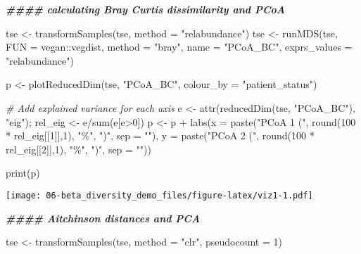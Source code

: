 \documentclass[
  oneside]{book}
\newenvironment{Shaded}{\begin{snugshade}}{\end{snugshade}}
\newcommand{\AttributeTok}[1]{\textcolor[rgb]{0.77,0.63,0.00}{#1}}
\newcommand{\CommentTok}[1]{\textcolor[rgb]{0.56,0.35,0.01}{\textit{#1}}}
\newcommand{\DecValTok}[1]{\textcolor[rgb]{0.00,0.00,0.81}{#1}}
\newcommand{\DocumentationTok}[1]{\textcolor[rgb]{0.56,0.35,0.01}{\textbf{\textit{#1}}}}
\newcommand{\FunctionTok}[1]{\textcolor[rgb]{0.00,0.00,0.00}{#1}}
\newcommand{\NormalTok}[1]{#1}
\newcommand{\OtherTok}[1]{\textcolor[rgb]{0.56,0.35,0.01}{#1}}
\newcommand{\SpecialCharTok}[1]{\textcolor[rgb]{0.00,0.00,0.00}{#1}}
\newcommand{\StringTok}[1]{\textcolor[rgb]{0.31,0.60,0.02}{#1}}
\begin{document}
\begin{Shaded}
\begin{Highlighting}[]
\DocumentationTok{\#\#\#\# calculating Bray Curtis dissimilarity and PCoA}

\NormalTok{tse }\OtherTok{\textless{}{-}} \FunctionTok{transformSamples}\NormalTok{(tse, }\AttributeTok{method =} \StringTok{"relabundance"}\NormalTok{)}
\NormalTok{tse }\OtherTok{\textless{}{-}} \FunctionTok{runMDS}\NormalTok{(tse, }\AttributeTok{FUN =}\NormalTok{ vegan}\SpecialCharTok{::}\NormalTok{vegdist, }\AttributeTok{method =} \StringTok{"bray"}\NormalTok{, }\AttributeTok{name =} \StringTok{"PCoA\_BC"}\NormalTok{, }\AttributeTok{exprs\_values =} \StringTok{"relabundance"}\NormalTok{)}


\NormalTok{p }\OtherTok{\textless{}{-}} \FunctionTok{plotReducedDim}\NormalTok{(tse, }\StringTok{"PCoA\_BC"}\NormalTok{, }\AttributeTok{colour\_by =} \StringTok{"patient\_status"}\NormalTok{)}

\CommentTok{\# Add explained variance for each axis}
\NormalTok{e }\OtherTok{\textless{}{-}} \FunctionTok{attr}\NormalTok{(}\FunctionTok{reducedDim}\NormalTok{(tse, }\StringTok{"PCoA\_BC"}\NormalTok{), }\StringTok{"eig"}\NormalTok{);}
\NormalTok{rel\_eig }\OtherTok{\textless{}{-}}\NormalTok{ e}\SpecialCharTok{/}\FunctionTok{sum}\NormalTok{(e[e}\SpecialCharTok{\textgreater{}}\DecValTok{0}\NormalTok{])          }
\NormalTok{p }\OtherTok{\textless{}{-}}\NormalTok{ p }\SpecialCharTok{+} \FunctionTok{labs}\NormalTok{(}\AttributeTok{x =} \FunctionTok{paste}\NormalTok{(}\StringTok{"PCoA 1 ("}\NormalTok{, }\FunctionTok{round}\NormalTok{(}\DecValTok{100} \SpecialCharTok{*}\NormalTok{ rel\_eig[[}\DecValTok{1}\NormalTok{]],}\DecValTok{1}\NormalTok{), }\StringTok{"\%"}\NormalTok{, }\StringTok{")"}\NormalTok{, }\AttributeTok{sep =} \StringTok{""}\NormalTok{),}
              \AttributeTok{y =} \FunctionTok{paste}\NormalTok{(}\StringTok{"PCoA 2 ("}\NormalTok{, }\FunctionTok{round}\NormalTok{(}\DecValTok{100} \SpecialCharTok{*}\NormalTok{ rel\_eig[[}\DecValTok{2}\NormalTok{]],}\DecValTok{1}\NormalTok{), }\StringTok{"\%"}\NormalTok{, }\StringTok{")"}\NormalTok{, }\AttributeTok{sep =} \StringTok{""}\NormalTok{))}

\FunctionTok{print}\NormalTok{(p)}
\end{Highlighting}
\end{Shaded}

\texttt{[image: 06-beta\_diversity\_demo\_files/figure-latex/viz1-1.pdf]}

\begin{Shaded}
\begin{Highlighting}[]
\DocumentationTok{\#\#\#\# Aitchinson distances and PCA}

\NormalTok{tse }\OtherTok{\textless{}{-}} \FunctionTok{transformSamples}\NormalTok{(tse, }\AttributeTok{method =} \StringTok{"clr"}\NormalTok{, }\AttributeTok{pseudocount =} \DecValTok{1}\NormalTok{)}
\end{Highlighting}
\end{Shaded}
\end{document}
